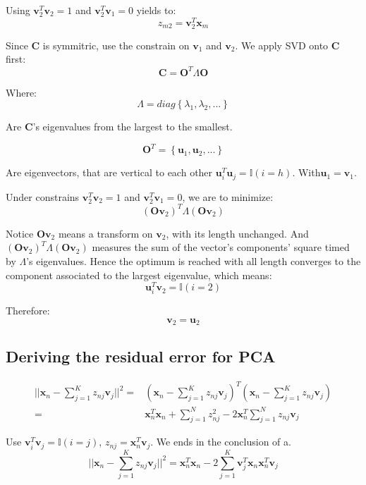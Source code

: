 \documentclass[UTF8]{ctexart}
\begin{document}
Using $\textbf{v}_{2}^{T}\textbf{v}_{2}=1$ and $\textbf{v}_{2}^{T}\textbf{v}_{1}=0$ yields to:
$$z_{m2}=\textbf{v}_{2}^{T}\textbf{x}_{m}$$

Since $\textbf{C}$ is symmitric, use the constrain on $\textbf{v}_{1}$ and $\textbf{v}_{2}$. We apply SVD onto $\textbf{C}$ first:
$$\textbf{C}=\textbf{O}^{T}\Lambda\textbf{O}$$

Where:
$$\Lambda = diag\left\{ \lambda_{1},\lambda_{2},... \right\}$$

Are $\textbf{C}$'s eigenvalues from the largest to the smallest.

$$\textbf{O}^{T}=\left\{ \textbf{u}_{1},\textbf{u}_{2},... \right\}$$

Are eigenvectors, that are vertical to each other $\textbf{u}_{i}^{T}\textbf{u}_{j}=\mathbb{I}(i=h)$. With$\textbf{u}_{1}=\textbf{v}_{1}$.

Under constrains $\textbf{v}_{2}^{T}\textbf{v}_{2}=1$ and $\textbf{v}_{2}^{T}\textbf{v}_{1}=0$, we are to minimize:
$$(\textbf{O}\textbf{v}_{2})^{T}\Lambda(\textbf{O}\textbf{v}_{2})$$

Notice $\textbf{O}\textbf{v}_{2}$ means a transform on $\textbf{v}_{2}$, with its length unchanged. And $(\textbf{O}\textbf{v}_{2})^{T}\Lambda(\textbf{O}\textbf{v}_{2})$ measures the sum of the vector's components' square timed by $\Lambda$'s eigenvalues. Hence the optimum is reached with all length converges to the component associated to the largest eigenvalue, which means:
$$\textbf{u}_{i}^{T}\textbf{v}_{2} = \mathbb{I}(i=2)$$

Therefore:
$$\textbf{v}_{2}=\textbf{u}_{2}$$

\subsection{Deriving the residual error for PCA}
\begin{align}
||\textbf{x}_{n}-\sum_{j=1}^{K}z_{nj}\textbf{v}_{j}||^{2}=&(\textbf{x}_{n}-\sum_{j=1}^{K}z_{nj}\textbf{v}_{j})^{T}(\textbf{x}_{n}-\sum_{j=1}^{K}z_{nj}\textbf{v}_{j})\nonumber \\
=&\textbf{x}_{n}^{T}\textbf{x}_{n}+\sum_{j=1}^{N}z_{nj}^{2} - 2\textbf{x}_{n}^{T}\sum_{j=1}^{N}z_{nj}\textbf{v}_{j}\nonumber
\end{align}

Use $\textbf{v}_{i}^{T}\textbf{v}_{j}=\mathbb{I}(i=j)$, $z_{nj}=\textbf{x}_{n}^{T}\textbf{v}_{j}$. We ends in the conclusion of a.
$$||\textbf{x}_{n}-\sum_{j=1}^{K}z_{nj}\textbf{v}_{j}||^{2}=\textbf{x}_{n}^{T}\textbf{x}_{n} - 2\sum_{j=1}^{K}\textbf{v}_{j}^{T}\textbf{x}_{n}\textbf{x}_{n}^{T}\textbf{v}_{j}$$
\end{document}
